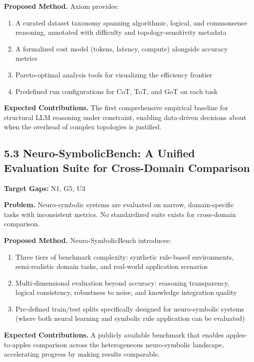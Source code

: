 \documentclass[11pt,a4paper]{article}
\begin{document}
\textbf{Proposed Method.} Axiom provides:
\begin{enumerate}
  \item A curated dataset taxonomy spanning algorithmic, logical, and commonsense reasoning, annotated with difficulty and topology-sensitivity metadata
  \item A formalized cost model (tokens, latency, compute) alongside accuracy metrics
  \item Pareto-optimal analysis tools for visualizing the efficiency frontier
  \item Predefined run configurations for CoT, ToT, and GoT on each task
\end{enumerate}

\textbf{Expected Contributions.} The first comprehensive empirical baseline for structural LLM reasoning under constraint, enabling data-driven decisions about when the overhead of complex topologies is justified.

\subsection{5.3 Neuro-SymbolicBench: A Unified Evaluation Suite for Cross-Domain Comparison}

\textbf{Target Gaps:} N1, G5, U3

\textbf{Problem.} Neuro-symbolic systems are evaluated on narrow, domain-specific tasks with inconsistent metrics. No standardized suite exists for cross-domain comparison.

\textbf{Proposed Method.} Neuro-SymbolicBench introduces:
\begin{enumerate}
  \item Three tiers of benchmark complexity: synthetic rule-based environments, semi-realistic domain tasks, and real-world application scenarios
  \item Multi-dimensional evaluation beyond accuracy: reasoning transparency, logical consistency, robustness to noise, and knowledge integration quality
  \item Pre-defined train/test splits specifically designed for neuro-symbolic systems (where both neural learning and symbolic rule application can be evaluated)
\end{enumerate}

\textbf{Expected Contributions.} A publicly available benchmark that enables apples-to-apples comparison across the heterogeneous neuro-symbolic landscape, accelerating progress by making results comparable.
\end{document}
